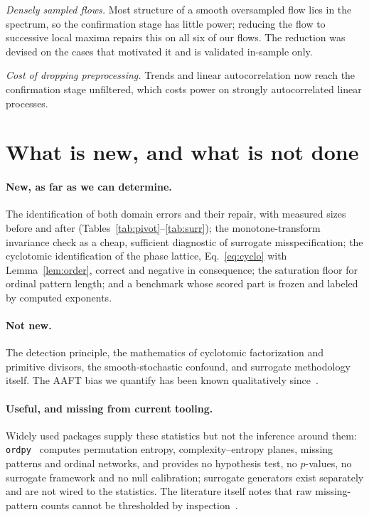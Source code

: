 \documentclass[11pt]{article}
\begin{document}
\emph{Densely sampled flows.} Most structure of a smooth oversampled flow lies
in the spectrum, so the confirmation stage has little power; reducing the flow
to successive local maxima repairs this on all six of our flows. The reduction
was devised on the cases that motivated it and is validated in-sample only.

\emph{Cost of dropping preprocessing.} Trends and linear autocorrelation now
reach the confirmation stage unfiltered, which costs power on strongly
autocorrelated linear processes.

\section{What is new, and what is not done}

\paragraph{New, as far as we can determine.} The identification of both domain
errors and their repair, with measured sizes before and after
(Tables~\ref{tab:pivot}--\ref{tab:surr}); the monotone-transform invariance
check as a cheap, sufficient diagnostic of surrogate misspecification; the
cyclotomic identification of the phase lattice, Eq.~\eqref{eq:cyclo} with
Lemma~\ref{lem:order}, correct and negative in consequence; the saturation floor
for ordinal pattern length; and a benchmark whose scored part is frozen and
labeled by computed exponents.

\paragraph{Not new.} The detection principle, the mathematics of cyclotomic
factorization and primitive divisors, the smooth-stochastic confound, and
surrogate methodology itself. The AAFT bias we quantify has been known
qualitatively since~\cite{kugiumtzis}.

\paragraph{Useful, and missing from current tooling.} Widely used packages
supply these statistics but not the inference around them:
\texttt{ordpy}~\cite{ordpy} computes permutation entropy, complexity--entropy
planes, missing patterns and ordinal networks, and provides no hypothesis test,
no $p$-values, no surrogate framework and no null calibration; surrogate
generators exist separately and are not wired to the statistics. The literature
itself notes that raw missing-pattern counts cannot be thresholded by
inspection~\cite{zanin}.
\end{document}
